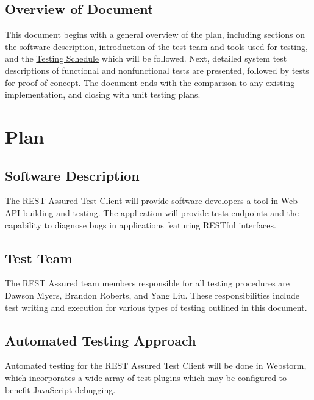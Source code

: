 \subsection{Overview of Document}
This document begins with a general overview of the plan, including sections on the software description, introduction of the test team and tools used for testing, and the \href{Table:sched}{Testing Schedule} which will be followed. Next, detailed system test descriptions of functional and nonfunctional \href{tests:frt:ui}{tests} are presented, followed by tests for proof of concept. The document ends with the comparison to any existing implementation, and closing with unit testing plans.


\section{Plan}

\subsection{Software Description}
The REST Assured Test Client will provide software developers a tool in Web API building and testing. The application will provide tests endpoints and the capability to diagnose bugs in applications featuring RESTful interfaces. 

\subsection{Test Team}
The REST Assured team members responsible for all testing procedures are Dawson Myers, Brandon Roberts, and Yang Liu. These responsibilities include test writing and execution for various types of testing outlined in this document.

\subsection{Automated Testing Approach}
Automated testing for the REST Assured Test Client will be done in Webstorm, which incorporates a wide array of test plugins which may be configured to benefit JavaScript debugging.

